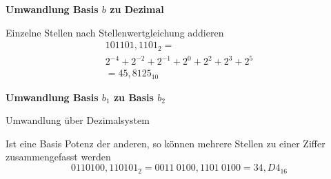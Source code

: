 \textbf{Umwandlung Basis $b$ zu Dezimal}
\begin{items}
	\item Einzelne Stellen nach Stellenwertgleichung addieren
	\begin{multline*}
		101101,1101_2 = \\ 2^{-4}+2^{-2}+2^{-1}+2^0+2^2+2^3+2^5 \\ = 45,8125_{10}
	\end{multline*}
\end{items}

\textbf{Umwandlung Basis $b_1$ zu Basis $b_2$}
\begin{enumeration}
	\item Umwandlung über Dezimalsystem
	\item Ist eine Basis Potenz der anderen, so können mehrere Stellen zu einer Ziffer zusammengefasst werden
	\begin{equation*}
		0110100,110101_2 = 0011 \ 0100,1101 \ 0100 = 34,D4_{16}
	\end{equation*}
\end{enumeration}

\newpage

